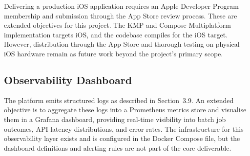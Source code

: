 Delivering a production iOS application requires an Apple Developer Program membership and submission through the App Store review process. These are extended objectives for this project. The KMP and Compose Multiplatform implementation targets iOS, and the codebase compiles for the iOS target. However, distribution through the App Store and thorough testing on physical iOS hardware remain as future work beyond the project's primary scope.

\subsection{Observability Dashboard}

The platform emits structured logs as described in Section~3.9. An extended objective is to aggregate these logs into a Prometheus metrics store and visualise them in a Grafana dashboard, providing real-time visibility into batch job outcomes, API latency distributions, and error rates. The infrastructure for this observability layer exists and is configured in the Docker Compose file, but the dashboard definitions and alerting rules are not part of the core deliverable.
